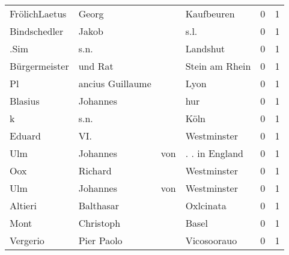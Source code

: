 \documentclass[10pt,a4paper,landscape]{article}
\begin{document}
\begin{longtable}{llllrr}
            FrölichLaetus &                              Georg &             &                                  Kaufbeuren &          0 &         1 \\
             Bindschedler &                              Jakob &             &                                        s.l. &          0 &         1 \\
                     .Sim &                               s.n. &             &                                    Landshut &          0 &         1 \\
            Bürgermeister &                            und Rat &             &                              Stein am Rhein &          0 &         1 \\
                       Pl &                   ancius Guillaume &             &                                        Lyon &          0 &         1 \\
                  Blasius &                           Johannes &             &                                         hur &          0 &         1 \\
                        k &                               s.n. &             &                                        Köln &          0 &         1 \\
                   Eduard &                                VI. &             &                                 Westminster &          0 &         1 \\
                      Ulm &                           Johannes &         von &                              . . in England &          0 &         1 \\
                      Oox &                            Richard &             &                                 Westminster &          0 &         1 \\
                      Ulm &                           Johannes &         von &                                 Westminster &          0 &         1 \\
                  Altieri &                          Balthasar &             &                                   Oxlcinata &          0 &         1 \\
                     Mont &                          Christoph &             &                                       Basel &          0 &         1 \\
                 Vergerio &                         Pier Paolo &             &                                 Vicosoorauo &          0 &         1 \\

\end{longtable}
\end{document}
